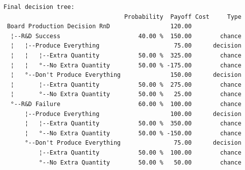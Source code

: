 \documentclass[]{article}
\begin{document}
\begin{verbatim}
Final decision tree:
                                  Probability  Payoff Cost     Type
 Board Production Decision RnD                 120.00              
  ¦--R&D Success                      40.00 %  150.00        chance
  ¦   ¦--Produce Everything                     75.00      decision
  ¦   ¦   ¦--Extra Quantity           50.00 %  325.00        chance
  ¦   ¦   °--No Extra Quantity        50.00 % -175.00        chance
  ¦   °--Don't Produce Everything              150.00      decision
  ¦       ¦--Extra Quantity           50.00 %  275.00        chance
  ¦       °--No Extra Quantity        50.00 %   25.00        chance
  °--R&D Failure                      60.00 %  100.00        chance
      ¦--Produce Everything                    100.00      decision
      ¦   ¦--Extra Quantity           50.00 %  350.00        chance
      ¦   °--No Extra Quantity        50.00 % -150.00        chance
      °--Don't Produce Everything               75.00      decision
          ¦--Extra Quantity           50.00 %  100.00        chance
          °--No Extra Quantity        50.00 %   50.00        chance
\end{verbatim}
\end{document}
